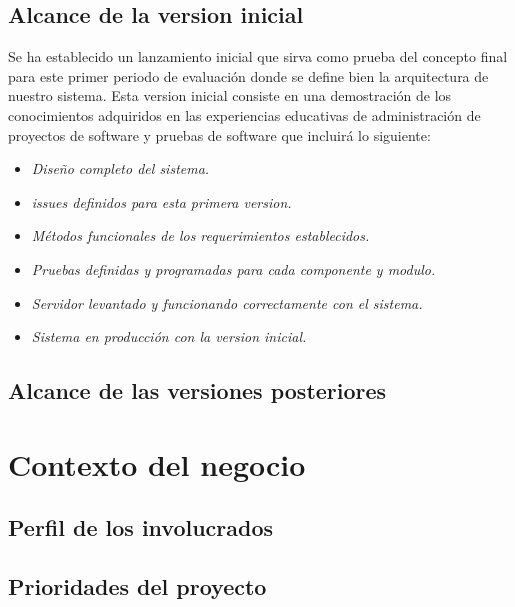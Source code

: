 \documentclass[12pt,a4paper]{book}
\begin{document}
\section{Alcance de la version inicial}
\vspace{0.5 cm}
Se ha establecido un lanzamiento inicial que sirva como prueba del concepto final para este primer periodo de evaluación donde se define bien la arquitectura de nuestro sistema.
Esta version inicial consiste en una demostración de los conocimientos adquiridos en las experiencias educativas de administración de proyectos de software y pruebas de software que incluirá lo siguiente: \\
\vspace{0.5 cm}
\begin{itemize}
\item \textit{Diseño completo del sistema.}
\item \textit{issues definidos para esta primera version.}
\item \textit{Métodos funcionales de los requerimientos establecidos.}
\item \textit{Pruebas definidas y programadas para cada componente y modulo.}
\item \textit{Servidor levantado y funcionando correctamente con el sistema.}
\item \textit{Sistema en producción con la version inicial.}
\end{itemize} 

\section{Alcance de las versiones posteriores}
\vspace{0.5 cm}

\chapter{Contexto del negocio}

\section{Perfil de los involucrados}
\vspace{0.5 cm}

\section{Prioridades del proyecto}
\vspace{0.5 cm}
\end{document}

